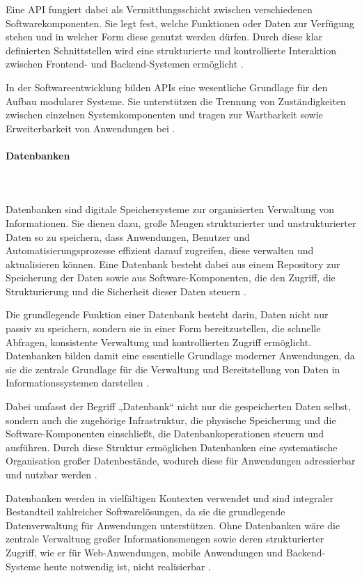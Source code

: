 Eine API fungiert dabei als Vermittlungsschicht zwischen verschiedenen Softwarekomponenten. Sie legt fest, welche Funktionen oder Daten zur Verfügung stehen und in welcher Form diese genutzt werden dürfen. Durch diese klar definierten Schnittstellen wird eine strukturierte und kontrollierte Interaktion zwischen Frontend- und Backend-Systemen ermöglicht \cite{talend_api_definition}.

In der Softwareentwicklung bilden APIs eine wesentliche Grundlage für den Aufbau modularer Systeme. Sie unterstützen die Trennung von Zuständigkeiten zwischen einzelnen Systemkomponenten und tragen zur Wartbarkeit sowie Erweiterbarkeit von Anwendungen bei \cite{talend_api_definition}.

\paragraph{Datenbanken}
\mbox{}\\
\mbox{}\\
Datenbanken sind digitale Speichersysteme zur organisierten Verwaltung von Informationen. Sie dienen dazu, große Mengen strukturierter und unstrukturierter Daten so zu speichern, dass Anwendungen, Benutzer und Automatisierungsprozesse effizient darauf zugreifen, diese verwalten und aktualisieren können. Eine Datenbank besteht dabei aus einem Repository zur Speicherung der Daten sowie aus Software-Komponenten, die den Zugriff, die Strukturierung und die Sicherheit dieser Daten steuern \cite{ibm_database}.

Die grundlegende Funktion einer Datenbank besteht darin, Daten nicht nur passiv zu speichern, sondern sie in einer Form bereitzustellen, die schnelle Abfragen, konsistente Verwaltung und kontrollierten Zugriff ermöglicht. Datenbanken bilden damit eine essentielle Grundlage moderner Anwendungen, da sie die zentrale Grundlage für die Verwaltung und Bereitstellung von Daten in Informationssystemen darstellen \cite{ibm_database}.

Dabei umfasst der Begriff „Datenbank“ nicht nur die gespeicherten Daten selbst, sondern auch die zugehörige Infrastruktur, die physische Speicherung und die Software-Komponenten einschließt, die Datenbankoperationen steuern und ausführen. Durch diese Struktur ermöglichen Datenbanken eine systematische Organisation großer Datenbestände, wodurch diese für Anwendungen adressierbar und nutzbar werden \cite{ibm_database}.

Datenbanken werden in vielfältigen Kontexten verwendet und sind integraler Bestandteil zahlreicher Softwarelösungen, da sie die grundlegende Datenverwaltung für Anwendungen unterstützen. Ohne Datenbanken wäre die zentrale Verwaltung großer Informationsmengen sowie deren strukturierter Zugriff, wie er für Web-Anwendungen, mobile Anwendungen und Backend-Systeme heute notwendig ist, nicht realisierbar \cite{ibm_database}.


